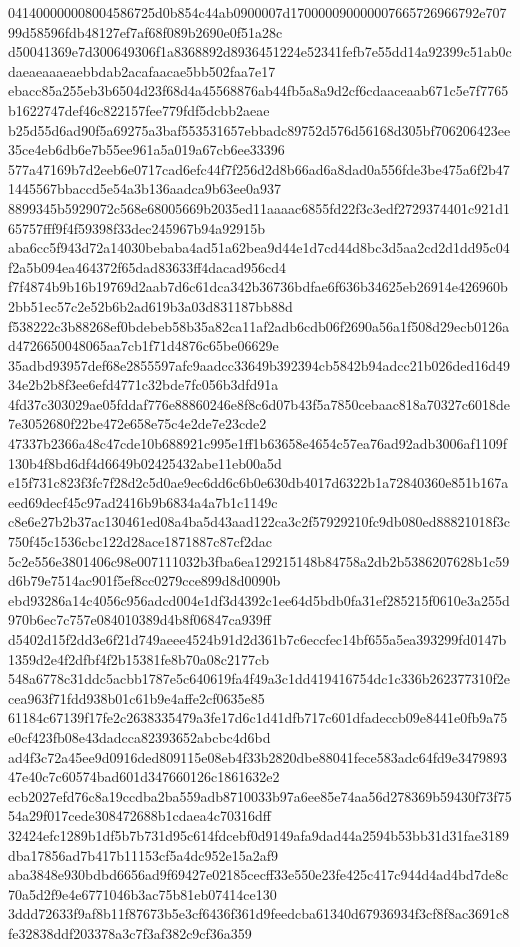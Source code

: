 \documentclass[11pt,a4paper]{article}
\begin{document}
{041400000008004586725d0b854c44ab0900007d170000090000007665726966792e70799d58596fdb48127ef7af68f089b2690e0f51a28c
d50041369e7d300649306f1a8368892d8936451224e52341fefb7e55dd14a92399c51ab0cdaeaeaaaeaebbdab2acafaacae5bb502faa7e17
ebacc85a255eb3b6504d23f68d4a45568876ab44fb5a8a9d2cf6cdaaceaab671c5e7f7765b1622747def46c822157fee779fdf5dcbb2aeae
b25d55d6ad90f5a69275a3baf553531657ebbadc89752d576d56168d305bf706206423ee35ce4eb6db6e7b55ee961a5a019a67cb6ee33396
577a47169b7d2eeb6e0717cad6efc44f7f256d2d8b66ad6a8dad0a556fde3be475a6f2b471445567bbaccd5e54a3b136aadca9b63ee0a937
8899345b5929072c568e68005669b2035ed11aaaac6855fd22f3c3edf2729374401c921d165757fff9f4f59398f33dec245967b94a92915b
aba6cc5f943d72a14030bebaba4ad51a62bea9d44e1d7cd44d8bc3d5aa2cd2d1dd95c04f2a5b094ea464372f65dad83633ff4dacad956cd4
f7f4874b9b16b19769d2aab7d6c61dca342b36736bdfae6f636b34625eb26914e426960b2bb51ec57c2e52b6b2ad619b3a03d831187bb88d
f538222c3b88268ef0bdebeb58b35a82ca11af2adb6cdb06f2690a56a1f508d29ecb0126ad4726650048065aa7cb1f71d4876c65be06629e
35adbd93957def68e2855597afc9aadcc33649b392394cb5842b94adcc21b026ded16d4934e2b2b8f3ee6efd4771c32bde7fc056b3dfd91a
4fd37c303029ae05fddaf776e88860246e8f8c6d07b43f5a7850cebaac818a70327c6018de7e3052680f22be472e658e75c4e2de7e23cde2
47337b2366a48c47cde10b688921c995e1ff1b63658e4654c57ea76ad92adb3006af1109f130b4f8bd6df4d6649b02425432abe11eb00a5d
e15f731c823f3fc7f28d2c5d0ae9ec6dd6c6b0e630db4017d6322b1a72840360e851b167aeed69decf45c97ad2416b9b6834a4a7b1c1149c
c8e6e27b2b37ac130461ed08a4ba5d43aad122ca3c2f57929210fc9db080ed88821018f3c750f45c1536cbc122d28ace1871887c87cf2dac
5c2e556e3801406c98e007111032b3fba6ea129215148b84758a2db2b5386207628b1c59d6b79e7514ac901f5ef8cc0279cce899d8d0090b
ebd93286a14c4056c956adcd004e1df3d4392c1ee64d5bdb0fa31ef285215f0610e3a255d970b6ec7c757e084010389d4b8f06847ca939ff
d5402d15f2dd3e6f21d749aeee4524b91d2d361b7c6eccfec14bf655a5ea393299fd0147b1359d2e4f2dfbf4f2b15381fe8b70a08c2177cb
548a6778c31ddc5acbb1787e5c640619fa4f49a3c1dd419416754dc1c336b262377310f2ecea963f71fdd938b01c61b9e4affe2cf0635e85
61184c67139f17fe2c2638335479a3fe17d6c1d41dfb717c601dfadeccb09e8441e0fb9a75e0cf423fb08e43dadcca82393652abcbc4d6bd
ad4f3c72a45ee9d0916ded809115e08eb4f33b2820dbe88041fece583adc64fd9e347989347e40c7c60574bad601d347660126c1861632e2
ecb2027efd76c8a19ccdba2ba559adb8710033b97a6ee85e74aa56d278369b59430f73f7554a29f017cede308472688b1cdaea4c70316dff
32424efc1289b1df5b7b731d95c614fdcebf0d9149afa9dad44a2594b53bb31d31fae3189dba17856ad7b417b11153cf5a4dc952e15a2af9
aba3848e930bdbd6656ad9f69427e02185cecff33e550e23fe425c417c944d4ad4bd7de8c70a5d2f9e4e6771046b3ac75b81eb07414ce130
3ddd72633f9af8b11f87673b5e3cf6436f361d9feedcba61340d67936934f3cf8f8ac3691c8fe32838ddf203378a3c7f3af382c9cf36a359
}
\end{document}
